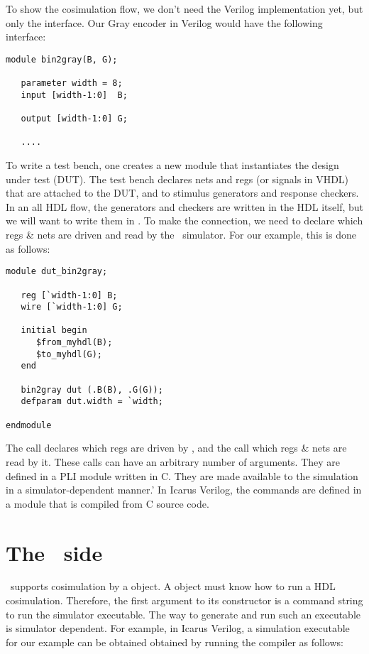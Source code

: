 To show the cosimulation flow, we don't need the Verilog
implementation yet, but only the interface.  Our Gray encoder in
Verilog would have the following interface:

\begin{verbatim}
module bin2gray(B, G);

   parameter width = 8;
   input [width-1:0]  B;     

   output [width-1:0] G;

   ....

\end{verbatim}

To write a test bench, one creates a new module that instantiates the
design under test (DUT).  The test bench declares nets and
regs (or signals in VHDL) that are attached to the DUT, and to
stimulus generators and response checkers. In an all HDL flow, the
generators and checkers are written in the HDL itself, but we will
want to write them in \myhdl{}. To make the connection, we need to
declare which regs \& nets are driven and read by the \myhdl\
simulator. For our example, this is done as follows:

\begin{verbatim}
module dut_bin2gray;

   reg [`width-1:0] B;
   wire [`width-1:0] G;

   initial begin
      $from_myhdl(B);
      $to_myhdl(G);
   end

   bin2gray dut (.B(B), .G(G));
   defparam dut.width = `width;

endmodule

\end{verbatim}

The  call declares which regs are driven by
\myhdl{}, and the  call which regs \& nets are read
by it. These calls can have an arbitrary number of arguments.  They
are defined in a PLI module written in C. They are made available to
the simulation in a simulator-dependent manner.'  In Icarus Verilog,
the commands are defined in a \code{myhdl.vpi} module that is compiled
from C source code.

\section{The \myhdl\ side}

\myhdl\ supports cosimulation by a  object. 
A \code{Cosimulation} object must know how to run a HDL cosimulation.
Therefore, the first argument to its constructor is a command string
to run the simulator executable. The way to generate and run such an
executable is simulator dependent.
For example, in Icarus Verilog, a simulation executable for our
example can be obtained obtained by running the 
compiler as follows:

